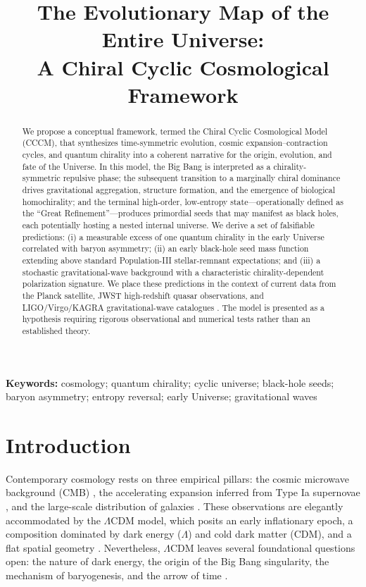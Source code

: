\documentclass[a4paper,11pt]{article}
\title{\bfseries The Evolutionary Map of the Entire Universe:\\
A Chiral Cyclic Cosmological Framework}
\author{
    Xiaohui Li\\
    \small Independent Researcher, Baoji, China\\
    \small ORCID: 0009-0003-8233-7191\\
    \small Correspondence: \href{mailto:danceluck@163.com}{danceluck@163.com}
    \\
    \href https://github.com/xiaohui-li-lab/dpm-simulations11-1
}
\date{}
\newcommand{\LCDM}{$\Lambda$CDM}
\newcommand{\CCCM}{CCCM}
\begin{document}
\maketitle

\begin{abstract}
\noindent
We propose a conceptual framework, termed the Chiral Cyclic Cosmological Model (\CCCM), that synthesizes time-symmetric evolution, cosmic expansion--contraction cycles, and quantum chirality into a coherent narrative for the origin, evolution, and fate of the Universe. In this model, the Big Bang is interpreted as a chirality-symmetric repulsive phase; the subsequent transition to a marginally chiral dominance drives gravitational aggregation, structure formation, and the emergence of biological homochirality; and the terminal high-order, low-entropy state---operationally defined as the ``Great Refinement''---produces primordial seeds that may manifest as black holes, each potentially hosting a nested internal universe. We derive a set of falsifiable predictions: (i) a measurable excess of one quantum chirality in the early Universe correlated with baryon asymmetry; (ii) an early black-hole seed mass function extending above standard Population-III stellar-remnant expectations; and (iii) a stochastic gravitational-wave background with a characteristic chirality-dependent polarization signature. We place these predictions in the context of current data from the Planck satellite, JWST high-redshift quasar observations, and LIGO/Virgo/KAGRA gravitational-wave catalogues \citep{Planck2020,Riess1998,Abazajian2005}. The model is presented as a hypothesis requiring rigorous observational and numerical tests rather than an established theory.
\end{abstract}

\noindent\textbf{Keywords:} cosmology; quantum chirality; cyclic universe; black-hole seeds; baryon asymmetry; entropy reversal; early Universe; gravitational waves

\section{Introduction}
\label{sec:intro}

Contemporary cosmology rests on three empirical pillars: the cosmic microwave background (CMB) \citep{Planck2020}, the accelerating expansion inferred from Type Ia supernovae \citep{Riess1998}, and the large-scale distribution of galaxies \citep{Abazajian2005}. These observations are elegantly accommodated by the \LCDM{} model, which posits an early inflationary epoch, a composition dominated by dark energy ($\Lambda$) and cold dark matter (CDM), and a flat spatial geometry \citep{Peebles2020}. Nevertheless, \LCDM{} leaves several foundational questions open: the nature of dark energy, the origin of the Big Bang singularity, the mechanism of baryogenesis, and the arrow of time \citep{Carroll2010}.
\end{document}
